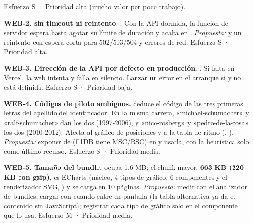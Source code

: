 Esfuerzo S · Prioridad alta (mucho valor por poco trabajo).

\textbf{WEB-2.  sin timeout ni reintento.} . Con la API dormida, la función de servidor espera hasta agotar su límite de duración y acaba en . \emph{Propuesta:}  y un reintento con espera corta para 502/503/504 y errores de red. Esfuerzo S · Prioridad alta.

\textbf{WEB-3. Dirección de la API por defecto en producción.} . Si falta  en Vercel, la web intenta  y falla en silencio. Lanzar un error en el arranque si  y no está definida. Esfuerzo S · Prioridad baja.

\textbf{WEB-4. Códigos de piloto ambiguos.}  deduce el código de las tres primeras letras del apellido del identificador. En la misma carrera, «michael-schumacher» y «ralf-schumacher» dan los dos  (1997-2006), y «nico-rosberg» y «pedro-de-la-rosa» los dos  (2010-2012). Afecta al gráfico de posiciones y a la tabla de ritmo (, ). \emph{Propuesta:} exponer  de  (F1DB tiene MSC/RSC) en  y usarla, con la heurística solo como último recurso. Esfuerzo S · Prioridad media.

\textbf{WEB-5. Tamaño del bundle.}  ocupa 1,6 MB; el chunk mayor, \textbf{663 KB (220 KB con gzip)}, es ECharts (núcleo, 4 tipos de gráfico, 6 componentes y el renderizador SVG, ) y se carga en 10 páginas. \emph{Propuesta:} medir con el analizador de bundles; cargar  con  cuando entre en pantalla (la tabla alternativa ya da el contenido sin JavaScript); registrar cada tipo de gráfico solo en el componente que lo usa. Esfuerzo M · Prioridad media.

